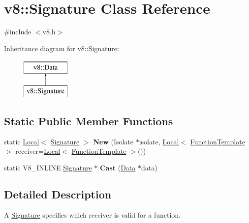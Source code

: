 \hypertarget{classv8_1_1Signature}{}\section{v8\+:\+:Signature Class Reference}
\label{classv8_1_1Signature}


{\ttfamily \#include $<$v8.\+h$>$}

Inheritance diagram for v8\+:\+:Signature\+:\begin{figure}[H]
\begin{center}
\leavevmode
\includegraphics[height=2.000000cm]{classv8_1_1Signature}
\end{center}
\end{figure}
\subsection*{Static Public Member Functions}
\begin{DoxyCompactItemize}
\item 
\mbox{\label{classv8_1_1Signature_a4e3d622674ec1f735e9981ec3309320f}} 
static \mbox{\hyperlink{classv8_1_1Local}{Local}}$<$ \mbox{\hyperlink{classv8_1_1Signature}{Signature}} $>$ {\bfseries New} (Isolate $\ast$isolate, \mbox{\hyperlink{classv8_1_1Local}{Local}}$<$ \mbox{\hyperlink{classv8_1_1FunctionTemplate}{Function\+Template}} $>$ receiver=\mbox{\hyperlink{classv8_1_1Local}{Local}}$<$ \mbox{\hyperlink{classv8_1_1FunctionTemplate}{Function\+Template}} $>$())
\item 
\mbox{\label{classv8_1_1Signature_a9c7566555923187ca55c14af8048a9fc}} 
static V8\+\_\+\+I\+N\+L\+I\+NE \mbox{\hyperlink{classv8_1_1Signature}{Signature}} $\ast$ {\bfseries Cast} (\mbox{\hyperlink{classv8_1_1Data}{Data}} $\ast$data)
\end{DoxyCompactItemize}


\subsection{Detailed Description}
A \mbox{\hyperlink{classv8_1_1Signature}{Signature}} specifies which receiver is valid for a function.

